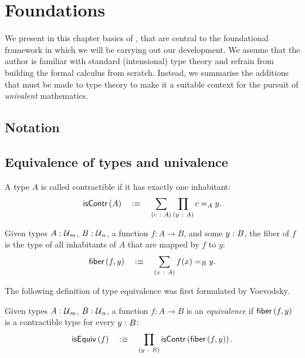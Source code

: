 \chapter{Foundations}\label{chap:foundations}

We present in this chapter basics of \UF{}, that are central to the foundational
framework in which we will be carrying out our development. We assume that the
author is familiar with standard (intensional) type theory and refrain from
building the formal calculus from scratch. Instead, we summarise the additions
that must be made to type theory to make it a suitable context for the pursuit
of \emph{univalent} mathematics.

\section{Notation}

\section{Equivalence of types and univalence}

\begin{defn}[Contractible]
  A type $A$ is called contractible if it has exactly one inhabitant:
  \begin{equation*}
    \mathsf{isContr}\left(A\right) \quad:\equiv\quad \sum_{(c~:~A)} \prod_{(y~:~A)} c =_A y.
  \end{equation*}
\end{defn}

\begin{defn}[Fiber]
  Given types $A\hspace{0.1mm}:\hspace{0.1mm}\mathcal{U}{}_m$, $B\hspace{0.1mm}:\hspace{0.1mm}\mathcal{U}{}_n$, a function
  $f : A \rightarrow B$, and some $y\hspace{0.1mm}:\hspace{0.1mm}B$, the fiber of $f$ is the type of all inhabitants
  of $A$ that are mapped by $f$ to $y$:
  \begin{equation*}
    \mathsf{fiber}\left(f, y\right) \quad:\equiv\quad \sum_{(x~:~A)} f(x) =_B y.
  \end{equation*}
\end{defn}

The following definition of type equivalence was first formulated by Voevodsky.
\begin{defn}\label{defn:equiv}
  Given types $A\hspace{0.1mm}:\hspace{0.1mm}\mathcal{U}{}_m$, $B\hspace{0.1mm}:\hspace{0.1mm}\mathcal{U}{}_n$, a function $f : A \rightarrow B$ is an
  \emph{equivalence} if $\mathsf{fiber}\left(f, y\right)$ is a contractible type for every $y\hspace{0.1mm}:\hspace{0.1mm}B$:
  \begin{equation*}
    \mathsf{isEquiv}\left(f\right) \quad:\equiv\quad \prod_{(y~:~B)} \mathsf{isContr}\left(\mathsf{fiber}\left(f, y\right)\right).
  \end{equation*}
\end{defn}

